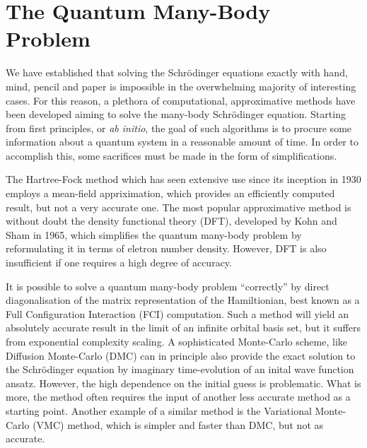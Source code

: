 \section{The Quantum Many-Body Problem}

    We have established that solving the Schrödinger equations exactly with hand, mind, 
    pencil and paper is 
    impossible in the overwhelming majority of interesting cases. For this reason, 
    a plethora of computational, approximative methods have been developed aiming 
    to solve the many-body Schrödinger equation. Starting from first principles,
    or \emph{ab initio}, the goal of such algorithms is to procure some information
    about a quantum system in a reasonable amount of time. In order to accomplish 
    this, some sacrifices must be made in the form of simplifications. 

    The Hartree-Fock
    method\cite{hartree1928wave,fock1930naherungsmethode,szabo2012modern} which 
    has seen extensive use since its inception in 1930
    employs a mean-field appriximation, which provides an efficiently computed result, 
    but not a very accurate one. The most popular approximative method is without doubt 
    the density functional theory (DFT), developed by Kohn and Sham in
    1965\cite{kohn1965self}, which simplifies the quantum many-body problem by reformulating 
    it in terms of eletron number density. However, DFT is also insufficient if one requires a 
    high degree of accuracy.

    It is possible to solve a quantum many-body problem  ``correctly'' by direct diagonalisation 
    of the matrix representation of the Hamiltionian, best known as a Full Configuration Interaction
    (FCI) computation. Such a method 
    will yield an absolutely accurate result in the limit of an infinite orbital basis set,
    but it suffers from exponential complexity scaling\cite{helgaker2014molecular}.
    A sophisticated Monte-Carlo scheme, like Diffusion Monte-Carlo (DMC) can in principle 
    also provide the exact solution to the Schrödinger equation by imaginary time-evolution 
    of an inital wave function ansatz\cite{hammond1994monte}. However, the high dependence on the 
    initial guess is problematic. What is more, the method often requires the input of
    another less accurate method as a starting point. Another 
    example of a similar method is the Variational Monte-Carlo (VMC) method, which is
    simpler and faster than DMC, but not as accurate.

